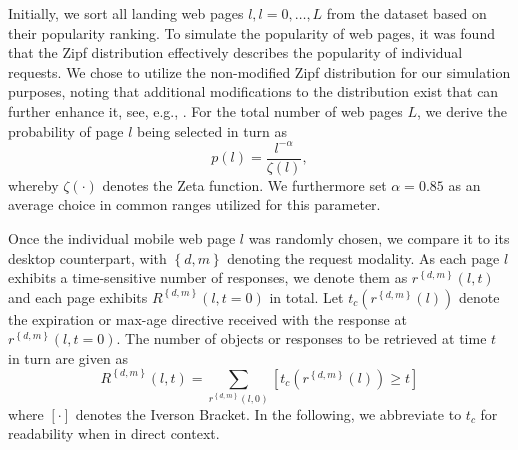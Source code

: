 \documentclass[letterpaper,journal,onecolumn,draftcls]{IEEEtran}
\begin{document}
Initially, we sort all landing web pages $l, l=0,\ldots,L$ from the 
dataset based on their popularity ranking.
To simulate the popularity of web pages, it was found that the Zipf distribution effectively describes the popularity of individual requests. %
We chose to utilize the non-modified Zipf distribution for our simulation purposes, noting that additional modifications to the distribution exist that can further enhance it, see, e.g., \cite{KrTeSh06}.
For the total number of web pages $L$, we derive the probability of page $l$ being selected in turn as
\begin{equation}
p(l)=\frac{l^{-\alpha}}{\zeta(l)},
\end{equation}
whereby $\zeta(\cdot)$ denotes the Zeta function. 
We furthermore set $\alpha=0.85$ as an average choice in common ranges utilized for this parameter.


Once the individual mobile web page $l$ was randomly chosen, we compare it to its desktop counterpart, with $\left\{ d,m \right\}$ denoting the request modality.
As each page $l$ exhibits a time-sensitive number of responses, we denote them as $r^{\left\{ d,m \right\}}(l,t)$ and each page exhibits $R^{\left\{ d,m \right\}}(l,t=0)$ in total.
Let $t_c(r^{\left\{ d,m \right\}}(l))$ denote the expiration or max-age directive received with the response at $r^{\left\{ d,m \right\}}(l,t=0)$.
The number of objects or responses to be retrieved at time $t$ in turn are given as 
\begin{equation}
R^{\left\{ d,m \right\}}(l,t) = \sum_{r^{\left\{ d,m \right\}}(l,0)} \left[ t_c(r^{\left\{ d,m \right\}}(l)) \ge t \right]
\end{equation}
where $\left[ \cdot \right] $ denotes the Iverson Bracket.
In the following, we abbreviate to $t_c$ for readability when in direct context.
\end{document}

